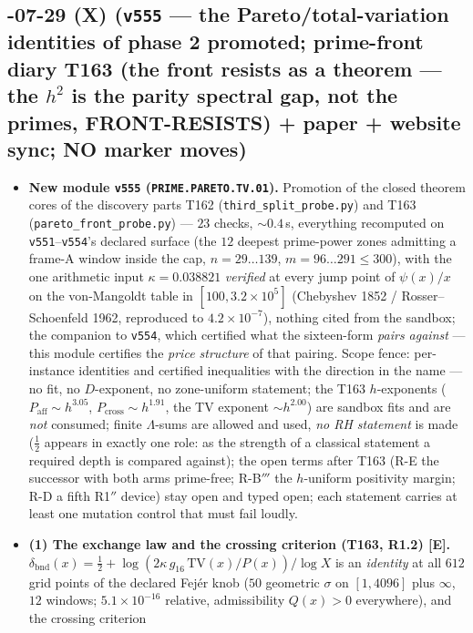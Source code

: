 \documentclass[11pt]{article}
\providecommand{\mE}{\textbf{[E]}}\providecommand{\mC}{\textbf{[C]}}
\begin{document}
\subsection*{-07-29 (X) (\texttt{v555} --- the Pareto/total-variation identities of phase 2 promoted; prime-front diary T163 (the front resists as a theorem --- the $h^2$ is the parity spectral gap, not the primes, FRONT-RESISTS) + paper + website sync; NO marker moves)}
\begin{itemize}[leftmargin=1.5em]
\item \textbf{New module \texttt{v555} (\texttt{PRIME.PARETO.TV.01}).} Promotion of
the closed theorem cores of the discovery parts T162 (\texttt{third\_split\_probe.py})
and T163 (\texttt{pareto\_front\_probe.py}) --- $23$ checks, ${\sim}0.4$\,s, everything
recomputed on \texttt{v551}--\texttt{v554}'s declared surface (the $12$ deepest
prime-power zones admitting a frame-A window inside the cap, $n=29\ldots139$,
$m=96\ldots291\le300$), with the one arithmetic input $\kappa=0.038821$
\emph{verified} at every jump point of $\psi(x)/x$ on the von-Mangoldt table in
$[100,3.2\times10^{5}]$ (Chebyshev 1852 / Rosser--Schoenfeld 1962, reproduced to
$4.2\times10^{-7}$), nothing cited from the sandbox; the companion to \texttt{v554},
which certified what the sixteen-form \emph{pairs against} --- this module certifies
the \emph{price structure} of that pairing. Scope fence: per-instance identities and
certified inequalities with the direction in the name --- no fit, no $D$-exponent, no
zone-uniform statement; the T163 $h$-exponents ($P_{\mathrm{aff}}\sim h^{3.05}$,
$P_{\mathrm{cross}}\sim h^{1.91}$, the TV exponent $\sim h^{2.00}$) are sandbox fits
and are \emph{not} consumed; finite $\Lambda$-sums are allowed and used, \emph{no RH
statement} is made ($\tfrac12$ appears in exactly one role: as the strength of a
classical statement a required depth is compared against); the open terms after T163
(R-E the successor with both arms prime-free; R-B$'''$ the $h$-uniform positivity
margin; R-D a fifth R1$''$ device) stay open and typed open; each statement carries at
least one mutation control that must fail loudly.
\item \textbf{(1) The exchange law and the crossing criterion (T163, R1.2) \mE.}
$\delta_{\mathrm{bnd}}(x)=\tfrac12+\log(2\kappa\,g_{16}\,\mathrm{TV}(x)/P(x))/\log X$
is an \emph{identity} at all $612$ grid points of the declared Fej\'er knob ($50$
geometric $\sigma$ on $[1,4096]$ plus $\infty$, $12$ windows; $5.1\times10^{-16}$
relative, admissibility $Q(x)>0$ everywhere), and the crossing criterion

\end{itemize}
\end{document}
